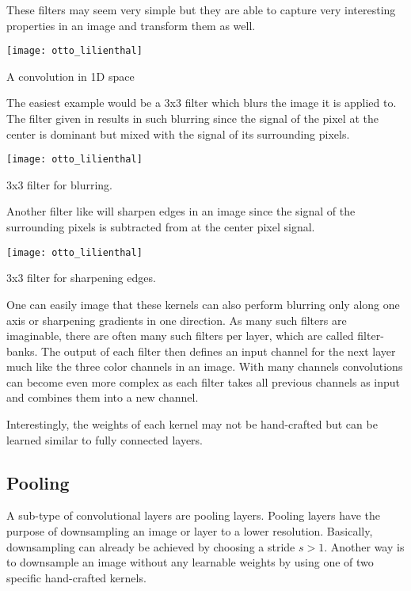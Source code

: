 These filters may seem very simple but they are able to capture very interesting properties in an image and transform them as well.
\begin{marginfigure}
    \texttt{[image: otto\_lilienthal]}
    \caption[]{A convolution in 1D space}
\end{marginfigure}
The easiest example would be a 3x3 filter which blurs the image it is applied to.
The filter given in  results in such blurring since the signal of the pixel at the center is dominant but mixed with the signal of its surrounding pixels.
\begin{marginfigure}
    \texttt{[image: otto\_lilienthal]}
    \caption[]{3x3 filter for blurring.}
\end{marginfigure}

Another filter like  will sharpen edges in an image since the signal of the surrounding pixels is subtracted from at the center pixel signal. 
\begin{marginfigure}
    \texttt{[image: otto\_lilienthal]}
    \caption[]{3x3 filter for sharpening edges.}
\end{marginfigure}

One can easily image that these kernels can also perform blurring only along one axis or sharpening gradients in one direction.
As many such filters are imaginable, there are often many such filters per layer, which are called filter-banks.
The output of each filter then defines an input channel for the next layer much like the three color channels in an image.
With many channels convolutions can become even more complex as each filter takes all previous channels as input and combines them into a new channel.

Interestingly, the weights of each kernel may not be hand-crafted but can be learned similar to fully connected layers.


\subsection{Pooling}
A sub-type of convolutional layers are pooling layers.
Pooling layers have the purpose of downsampling an image or layer to a lower resolution.
Basically, downsampling can already be achieved by choosing a stride $s > 1$.
Another way is to downsample an image without any learnable weights by using one of two specific hand-crafted kernels.

